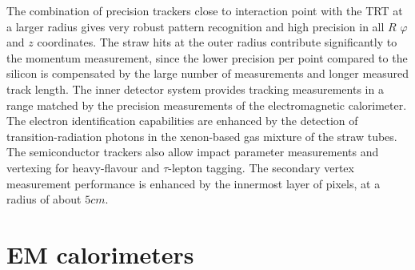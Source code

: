 The combination of precision trackers close to interaction point with the TRT at a larger radius gives very
robust pattern recognition and high precision in all $R$ $\varphi$ and $z$ coordinates. The straw hits at the
outer radius contribute significantly to the momentum measurement, since the lower precision per
point compared to the silicon is compensated by the large number of measurements and longer
measured track length.
The inner detector system provides tracking measurements in a range matched by the precision measurements of the electromagnetic calorimeter. The electron identification capabilities
are enhanced by the detection of transition-radiation photons in the xenon-based gas mixture of
the straw tubes. The semiconductor trackers also allow impact parameter measurements and vertexing for heavy-flavour and $\tau$-lepton tagging. The secondary vertex measurement performance is enhanced by the innermost layer of pixels, at a radius of about $5 cm$.


\section{EM calorimeters}
\label{sec:ATLAS_EM_calo}

\begin{figure}[htb]
\end{figure}


